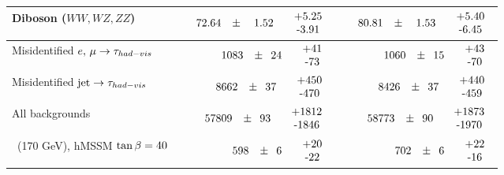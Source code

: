 \begin{table}
\begin{center}
{\begin{tabular}{l|r|r}
			Diboson ($WW, WZ, ZZ$) &  $\phantom{000}72.64\phantom{.0}\pm\phantom{00}1.52\phantom{.0}\phantom{0}\begin{tabular}{c}+5.25 \\-3.91\end{tabular}$ & $\phantom{000}80.81\phantom{.0}\pm\phantom{00}1.53\phantom{.0}\phantom{0}\begin{tabular}{c}+5.40 \\-6.45\end{tabular}$ \\ \hline
			Misidentified $e,\,\mu \to \tau_{had-vis}$   &   $\phantom{0}1083\phantom{.0}\pm\phantom{0}24\phantom{.0}\phantom{0}\begin{tabular}{c}+41 \\-73\end{tabular}$ & $\phantom{0}1060\phantom{.0}\pm\phantom{0}15\phantom{.0}\phantom{0}\begin{tabular}{c}+43 \\-70\end{tabular}$ \\ \hline
			Misidentified $\mbox{jet} \to \tau_{had-vis}$ &   $\phantom{0}8662\phantom{.0}\pm\phantom{0}37\phantom{.0}\phantom{0}\begin{tabular}{c}+450 \\-470\end{tabular}$ & $\phantom{0}8426\phantom{.0}\pm\phantom{0}37\phantom{.0}\phantom{0}\begin{tabular}{c}+440 \\-459\end{tabular}$ \\ \hline
			\hline
			All backgrounds   &  $57809\phantom{.0}\pm\phantom{0} 93\phantom{.0}\phantom{0}\begin{tabular}{c}+1812 \\-1846\end{tabular}$ & $58773\phantom{.0}\pm\phantom{0} 90\phantom{.0}\phantom{0}\begin{tabular}{c}+1873 \\-1970\end{tabular}$ \\
			\hline
			\Hpm $\phantom{0}$(170 GeV), hMSSM $\tan\beta=40$ & $\phantom{0}598\phantom{.0}\pm\phantom{0}6\phantom{.0}\phantom{0}\begin{tabular}{c}+20 \\-22\end{tabular}$ & $\phantom{0}702\phantom{.0}\pm\phantom{0}6\phantom{.0}\phantom{0}\begin{tabular}{c}+22 \\-16\end{tabular}$ \\

\end{tabular}}
\end{center}
\end{table}
